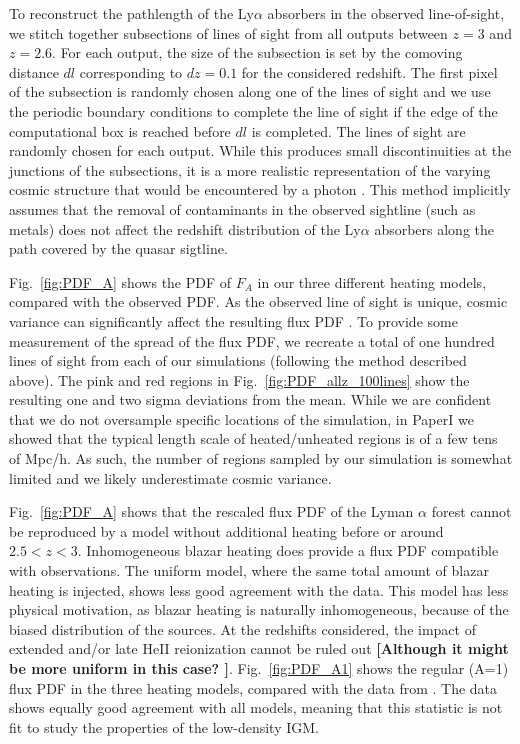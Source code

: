 \documentclass[numberedappendix]{emulateapj}
\newcommand\ALc[1]{{\color{red} \bf #1}} %
\begin{document}

To reconstruct the pathlength of the Ly$\alpha$ absorbers in the  observed line-of-sight, we stitch together subsections of lines of sight from all outputs between $z=3$ and $z=2.6$. For each output, the size of the subsection is set by the comoving distance $dl$ corresponding to $dz=0.1$ for the considered redshift. The first pixel of the subsection is randomly chosen along one  of the lines of sight and we use the periodic boundary conditions to complete the line of sight if the edge of the computational box is reached before $dl$ is completed. The lines of sight are randomly chosen for each output. While this produces small discontinuities at the junctions of the subsections, it is a more realistic representation of the varying cosmic structure that would be encountered by a photon \citep[see e.g.][for a discussion]{2016arXiv161203935H}. This method implicitly assumes that the removal of contaminants in the observed sightline (such as metals) does not affect the redshift distribution of the Ly$\alpha$ absorbers along the path covered by  the quasar sigtline.

Fig.~\ref{fig:PDF_A} shows the PDF of $F_A$ in our three different heating models, compared with the observed PDF.  As the observed line of sight is unique, cosmic variance can significantly affect the resulting flux PDF \citep{2013MNRAS.428..540R,2017MNRAS.466.2690R}. To provide some measurement of the spread of the flux PDF, we recreate a total of one hundred  lines of sight from each of our simulations (following the method described above). The pink and red regions in Fig.~\ref{fig:PDF_allz_100lines} show the resulting one and two sigma deviations from the mean. While we are confident that we do not oversample specific locations of the simulation, in PaperI we showed that the typical length scale  of heated/unheated regions is of a few tens of Mpc/h. As such, the number of regions sampled by our simulation is somewhat limited and we likely underestimate cosmic variance. 


Fig.~\ref{fig:PDF_A} shows that the rescaled flux PDF of the Lyman $\alpha$ forest cannot be reproduced by a model without additional heating before or around $2.5<z<3$. Inhomogeneous blazar heating does provide a flux PDF compatible with observations. The uniform model, where the same total amount of blazar heating is injected, shows less good agreement with the data. This model has less physical motivation, as blazar heating is naturally inhomogeneous, because of the biased distribution of the sources.  At the redshifts considered, the impact of extended and/or late HeII reionization cannot be ruled out \ALc{[Although it might be more uniform in this case? ]}.  Fig.~\ref{fig:PDF_A1} shows the regular (A=1)  flux PDF in the three heating models, compared with the data from \citet{2013MNRAS.428..540R}. The data shows equally good agreement with all models, meaning that this statistic is not fit to study the properties of the low-density IGM.
\end{document}
